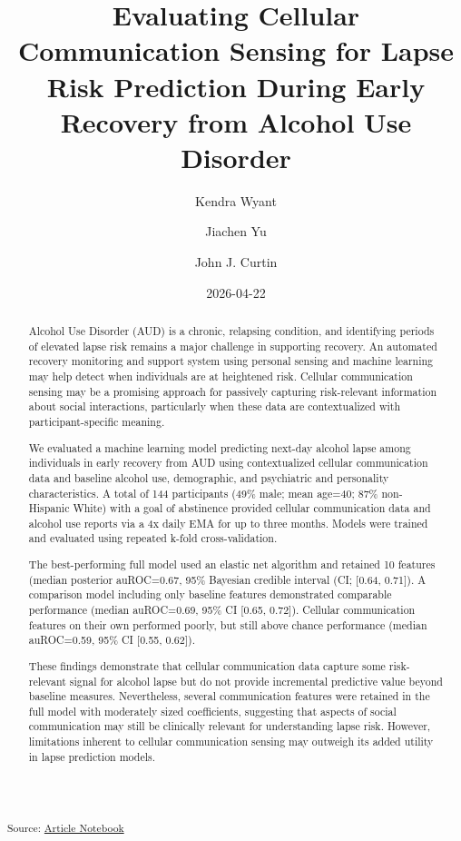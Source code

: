 \documentclass[
  letterpaper,
  DIV=11,
  numbers=noendperiod]{scrartcl}
\title{Evaluating Cellular Communication Sensing for Lapse Risk
Prediction During Early Recovery from Alcohol Use Disorder}
\author{Kendra Wyant \and Jiachen Yu \and John J. Curtin}
\date{2026-04-22}
\begin{document}
\maketitle
\begin{abstract}
Alcohol Use Disorder (AUD) is a chronic, relapsing condition, and
identifying periods of elevated lapse risk remains a major challenge in
supporting recovery. An automated recovery monitoring and support system
using personal sensing and machine learning may help detect when
individuals are at heightened risk. Cellular communication sensing may
be a promising approach for passively capturing risk-relevant
information about social interactions, particularly when these data are
contextualized with participant-specific meaning.

We evaluated a machine learning model predicting next-day alcohol lapse
among individuals in early recovery from AUD using contextualized
cellular communication data and baseline alcohol use, demographic, and
psychiatric and personality characteristics. A total of 144 participants
(49\% male; mean age=40; 87\% non-Hispanic White) with a goal of
abstinence provided cellular communication data and alcohol use reports
via a 4x daily EMA for up to three months. Models were trained and
evaluated using repeated k-fold cross-validation.

The best-performing full model used an elastic net algorithm and
retained 10 features (median posterior auROC=0.67, 95\% Bayesian
credible interval (CI; {[}0.64, 0.71{]}). A comparison model including
only baseline features demonstrated comparable performance (median
auROC=0.69, 95\% CI {[}0.65, 0.72{]}). Cellular communication features
on their own performed poorly, but still above chance performance
(median auROC=0.59, 95\% CI {[}0.55, 0.62{]}).

These findings demonstrate that cellular communication data capture some
risk-relevant signal for alcohol lapse but do not provide incremental
predictive value beyond baseline measures. Nevertheless, several
communication features were retained in the full model with moderately
sized coefficients, suggesting that aspects of social communication may
still be clinically relevant for understanding lapse risk. However,
limitations inherent to cellular communication sensing may outweigh its
added utility in lapse prediction models.
\end{abstract}


\textsubscript{Source:
\href{https://jjcurtin.github.io/study_messages/index.qmd.html}{Article
Notebook}}
\end{document}
